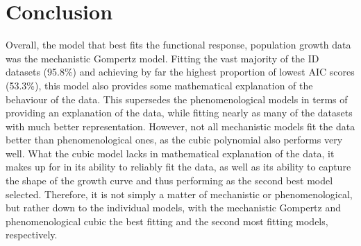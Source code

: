 \documentclass[11pt, a4paper]{article} %
\begin{document}
\section{Conclusion}

Overall, the model that best fits the functional response, population growth data was the mechanistic Gompertz model. Fitting the vast majority of the ID datasets (95.8\%) and achieving by far the highest proportion of lowest AIC scores (53.3\%), this model also provides some mathematical explanation of the behaviour of the data. This supersedes the phenomenological models in terms of providing an explanation of the data, while fitting nearly as many of the datasets with much better representation. However, not all mechanistic models fit the data better than phenomenological ones, as the cubic polynomial also performs very well. What the cubic model lacks in mathematical explanation of the data, it makes up for in its ability to reliably fit the data, as well as its ability to capture the shape of the growth curve and thus performing as the second best model selected. Therefore, it is not simply a matter of mechanistic or phenomenological, but rather down to the individual models, with the mechanistic Gompertz and phenomenological cubic the best fitting and the second most fitting models, respectively.


\end{document}
